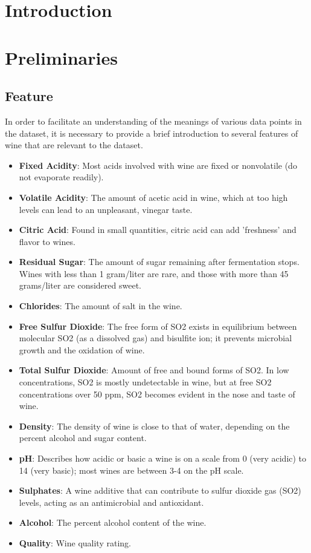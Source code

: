 \section{Introduction}


\section{Preliminaries} 
\subsection{Feature}\phantom{...}

In order to facilitate an understanding of the meanings of various data points in the dataset, it is necessary to provide a brief introduction to several features of wine that are relevant to the dataset.
\begin{itemize}
	\item \textbf{Fixed Acidity}: Most acids involved with wine are fixed or nonvolatile (do not evaporate readily).
	\item \textbf{Volatile Acidity}: The amount of acetic acid in wine, which at too high levels can lead to an unpleasant, vinegar taste.
	\item \textbf{Citric Acid}: Found in small quantities, citric acid can add 'freshness' and flavor to wines.
	\item \textbf{Residual Sugar}: The amount of sugar remaining after fermentation stops. Wines with less than 1 gram/liter are rare, and those with more than 45 grams/liter are considered sweet.
	\item \textbf{Chlorides}: The amount of salt in the wine.
	\item \textbf{Free Sulfur Dioxide}: The free form of SO2 exists in equilibrium between molecular SO2 (as a dissolved gas) and bisulfite ion; it prevents microbial growth and the oxidation of wine.
	\item \textbf{Total Sulfur Dioxide}: Amount of free and bound forms of SO2. In low concentrations, SO2 is mostly undetectable in wine, but at free SO2 concentrations over 50 ppm, SO2 becomes evident in the nose and taste of wine.
	\item \textbf{Density}: The density of wine is close to that of water, depending on the percent alcohol and sugar content.
	\item \textbf{pH}: Describes how acidic or basic a wine is on a scale from 0 (very acidic) to 14 (very basic); most wines are between 3-4 on the pH scale.
	\item \textbf{Sulphates}: A wine additive that can contribute to sulfur dioxide gas (SO2) levels, acting as an antimicrobial and antioxidant.
	\item \textbf{Alcohol}: The percent alcohol content of the wine.
	\item \textbf{Quality}: Wine quality rating.
\end{itemize}
